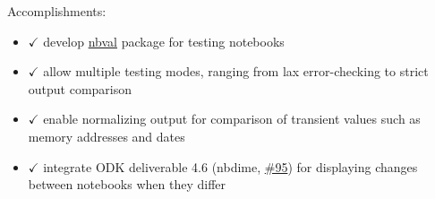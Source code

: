 Accomplishments:

\begin{itemize}
\tightlist
\item
  \(\checkmark\) develop
  \href{https://github.com/computationalmodelling/nbval}{nbval} package
  for testing notebooks
\item
  \(\checkmark\) allow multiple testing modes, ranging from lax
  error-checking to strict output comparison
\item
  \(\checkmark\) enable normalizing output for comparison of transient
  values such as memory addresses and dates
\item
  \(\checkmark\) integrate ODK deliverable 4.6 (nbdime,
  \href{https://github.com/OpenDreamKit/OpenDreamKit/issues/95}{\#95})
  for displaying changes between notebooks when they differ
\end{itemize}
